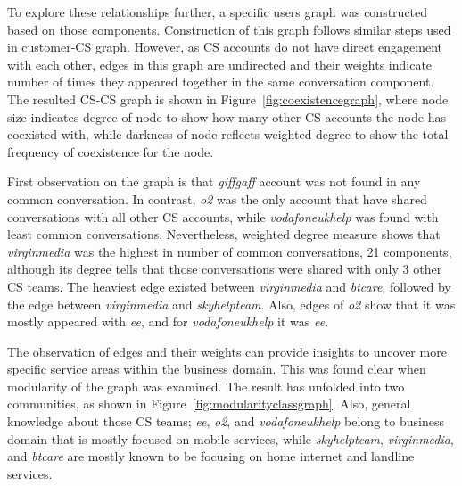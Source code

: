 \documentclass[sigconf]{acmart}
\begin{document}
To explore these relationships further, a specific users graph was constructed 
based on those components. Construction of this graph follows similar steps used in 
customer-CS graph. However, as CS accounts do not have direct engagement 
with each other, edges in this graph are undirected and their weights indicate number 
of times they appeared together in the same conversation component. 
The resulted CS-CS graph is shown in Figure~\ref{fig:coexistencegraph}, where 
node size indicates degree of node to show how many other CS accounts the node 
has coexisted with, while darkness of node reflects weighted degree to show the 
total frequency of coexistence for the node.   

First observation on the graph is that {\emph{giffgaff}} account was not found in 
any common conversation. In contrast, {\emph{o2}} was the only account
that have shared conversations with all other CS accounts, while
{\emph{vodafoneukhelp}} was found with least common
conversations. Nevertheless, weighted degree measure shows that
{\emph{virginmedia}} was the highest in number of common
conversations, 21 components, although its degree tells that those 
conversations were shared with only 3 other CS teams. The heaviest edge
existed between {\emph{virginmedia}} and {\emph{btcare}}, followed by
the edge between {\emph{virginmedia}} and {\emph{skyhelpteam}}. Also,
edges of {\emph{o2}} show that it was mostly appeared with
{\emph{ee}}, and for {\emph{vodafoneukhelp}} it was {\emph{ee}}.

The observation of edges and their weights can provide insights to
uncover more specific service areas within the business domain. This
was found clear when modularity of the graph was examined. The result
has unfolded into two communities, as shown in
Figure~\ref{fig:modularityclassgraph}. Also, general knowledge about
those CS teams; {\emph{ee}}, {\emph{o2}}, and {\emph{vodafoneukhelp}}
belong to business domain that is mostly focused on mobile services,
while {\emph{skyhelpteam}}, {\emph{virginmedia}}, and {\emph{btcare}}
are mostly known to be focusing on home internet and landline
services.
\end{document}
